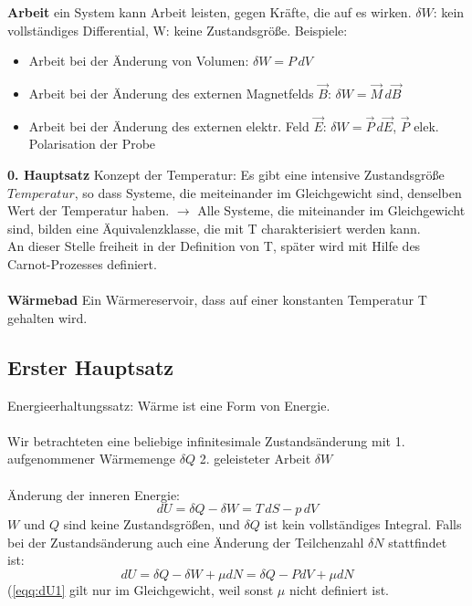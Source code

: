\documentclass[a4paper,11pt]{scrartcl}
\begin{document}
\textbf{Arbeit} ein System kann Arbeit leisten, gegen Kräfte, die auf es wirken. $\delta W$: kein vollständiges Differential, W: keine Zustandsgröße.
Beispiele: 
\begin{itemize}
 \item Arbeit bei der Änderung von Volumen: $\delta W = P\, dV$
 \item Arbeit bei der Änderung des externen Magnetfelds $\vec{B}$:  $\delta W = \vec{M} \, d\vec{B}$
 \item Arbeit bei der Änderung des externen elektr. Feld $\vec{E}$: $\delta W = \vec{P} \, d\vec{E}$, $\vec{P}$ elek. Polarisation der Probe
\end{itemize}

\textbf{0. Hauptsatz} Konzept der Temperatur: Es gibt eine intensive Zustandsgröße $Temperatur$, so dass Systeme, die meiteinander im Gleichgewicht sind, denselben Wert der Temperatur haben.
$\rightarrow$ Alle Systeme, die miteinander im Gleichgewicht sind, bilden eine Äquivalenzklasse, die mit T charakterisiert werden kann.\\
An dieser Stelle freiheit in der Definition von T, später wird mit Hilfe des Carnot-Prozesses definiert.\\
\\
\textbf{Wärmebad} Ein Wärmereservoir, dass auf einer konstanten Temperatur T gehalten wird.

\subsection{Erster Hauptsatz}
Energieerhaltungssatz: Wärme ist eine Form von Energie.\\
\\ 
Wir betrachteten eine beliebige infinitesimale Zustandsänderung mit 1. aufgenommener Wärmemenge $\delta Q$ 2. geleisteter Arbeit $\delta W$\\
\\
Änderung der inneren Energie: 
\begin{equation}
 dU = \delta Q - \delta W = T\, dS- p \, dV
\end{equation}
$W$ und $Q$ sind keine Zustandsgrößen, und $\delta Q$ ist kein vollständiges Integral.
Falls bei der Zustandsänderung auch eine Änderung der Teilchenzahl $\delta N$ stattfindet ist:
\begin{equation}
 dU = \delta Q - \delta W + \mu dN= \delta Q - P dV + \mu dN
\end{equation}\label{eqq:dU1}
(\ref{eqq:dU1} gilt nur im Gleichgewicht, weil sonst $\mu $ nicht definiert ist.
\end{document}
